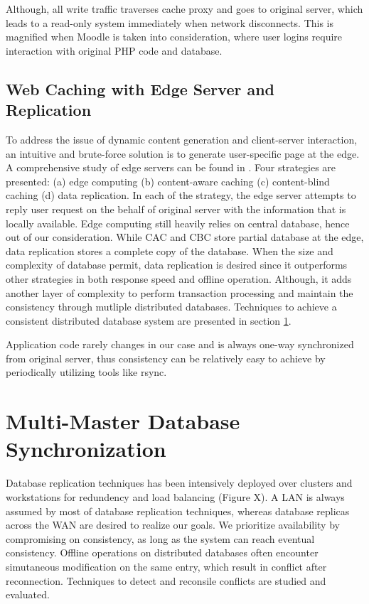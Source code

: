 Although, all write traffic traverses cache proxy and goes to original server, which leads to a read-only system immediately when network disconnects. This is magnified when Moodle is taken into consideration, where user logins require interaction with original PHP code and database.


\subsection{Web Caching with Edge Server and Replication}
To address the issue of dynamic content generation and client-server interaction, an intuitive and brute-force solution is to generate user-specific page at the edge. A comprehensive study of edge servers can be found in \cite{pathan2008content}. Four strategies are presented: (a) edge computing (b) content-aware caching (c) content-blind caching (d) data replication.
In each of the strategy, the edge server attempts to reply user request on the behalf of original server with the information that is locally available. Edge computing still heavily relies on central database, hence out of our consideration. While CAC and CBC store partial database at the edge, data replication stores a complete copy of the database. When the size and complexity of database permit, data replication is desired since it outperforms other strategies in both response speed and offline operation. Although, it adds another layer of complexity to perform transaction processing and maintain the consistency through mutliple distributed databases. Techniques to achieve a consistent distributed database system are presented in section \ref{database_sync}.

Application code rarely changes in our case and is always one-way synchronized from original server, thus consistency can be relatively easy to achieve by periodically utilizing tools like rsync\cite{tridgell1999efficient}.


\section{Multi-Master Database Synchronization} \label{database_sync}
Database replication techniques has been intensively deployed over clusters and workstations for redundency and load balancing (Figure X).  A LAN is always assumed by most of database replication techniques, whereas database replicas across the WAN are desired to realize our goals. We prioritize availability by compromising on consistency, as long as the system can reach eventual consistency\cite{vogels2009eventually}. Offline operations on distributed databases often encounter simutaneous modification on the same entry, which result in conflict after reconnection. Techniques to detect and reconsile conflicts are studied and evaluated.

